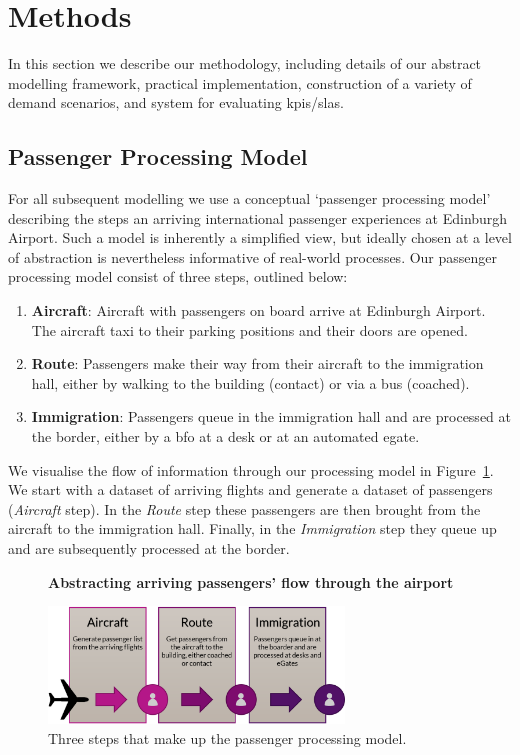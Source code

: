 \documentclass[10pt]{article}
\newcommand*{\figuretitle}[1]{%
    {\centering%
    \textbf{#1}%
    \par\medskip}%
}
\begin{document}
\section{Methods} \label{sec:methods}

In this section we describe our methodology, including details of our abstract modelling framework, practical implementation, construction of a variety of demand scenarios, and system for evaluating \glspl{kpi}/\glspl{sla}.

\subsection{Passenger Processing Model}

    For all subsequent modelling we use a conceptual `passenger processing model' describing the steps an arriving international passenger experiences at Edinburgh Airport. Such a model is inherently a simplified view, but ideally chosen at a level of abstraction is nevertheless informative of real-world processes. Our passenger processing model consist of three steps, outlined below:
\begin{enumerate}
    \item \textbf{Aircraft}: Aircraft with passengers on board arrive at Edinburgh Airport. The aircraft taxi to their parking positions and their doors are opened. \label{step:aircraft}
    \item \textbf{Route}: Passengers make their way from their aircraft to the immigration hall, either by walking to the building (contact) or via a bus (coached). \label{step:route}
    \item \textbf{Immigration}: Passengers queue in the immigration hall and are processed at the border, either by a \gls{bfo} at a desk or at an automated \gls{egate}. \label{step:immigration}
\end{enumerate}
 We visualise the flow of information through our processing model in Figure~\ref{fig:PPM_threesteps}. We start with a dataset of arriving flights and generate a dataset of passengers (\textit{Aircraft} step). In the \textit{Route} step these passengers are then brought from the aircraft to the immigration hall. Finally, in the \textit{Immigration} step they queue up and are subsequently processed at the border.

\begin{figure}[!ht]
    \centering
    \figuretitle{Abstracting arriving passengers' flow through the airport}
    \includegraphics[width=0.7\textwidth]{figures/ThreeSteps.png}
     \caption{Three steps that make up the passenger processing model.} \label{fig:PPM_threesteps}
\end{figure}
\end{document}
